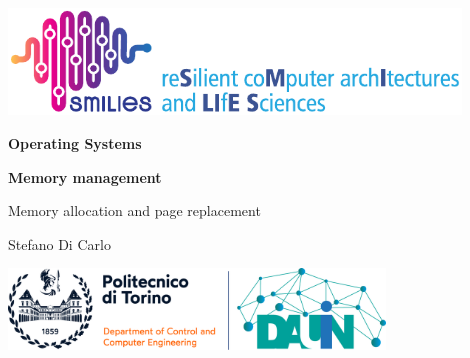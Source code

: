 \pagecolor{white}\afterpage{\nopagecolor}


\includegraphics[width=12cm]{images/smilies_logo_web}
\vspace{1.5in}

\begin{singlespace}
\fontsize{50}{65}\selectfont \textcolor{FSBlue}{\textbf{Operating Systems\\}}

\fontsize{50}{65}\selectfont \textcolor{FSBlue}{\textbf{Memory management}}

\vspace{10mm}
\LARGE\textcolor{FSBlue}{Memory allocation and page replacement}

\vspace{0.5in}

\Large\textcolor{FSBlue}{Stefano Di Carlo}

\vspace{1.5in}

\includegraphics[width=10cm, right]{images/COLORI_2021_DAUIN.png}
\end{singlespace}

\thispagestyle{empty}
\restoregeometry   
\newpage
